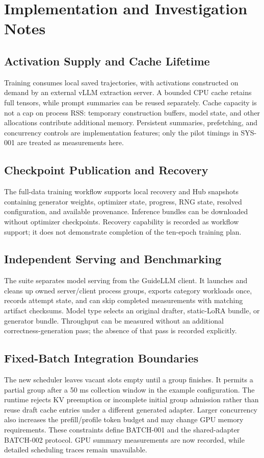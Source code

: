 \section{Implementation and Investigation Notes}
\label{sec:implementation}

\subsection{Activation Supply and Cache Lifetime}
Training consumes local saved trajectories, with activations constructed on
demand by an external vLLM extraction server. A bounded CPU cache retains full
tensors, while prompt summaries can be reused separately. Cache capacity is
not a cap on process RSS: temporary construction buffers, model state, and
other allocations contribute additional memory. Persistent summaries,
prefetching, and concurrency controls are implementation features; only the
pilot timings in SYS-001 are treated as measurements here.

\subsection{Checkpoint Publication and Recovery}
The full-data training workflow supports local recovery and Hub snapshots
containing generator weights, optimizer state, progress, RNG state, resolved
configuration, and available provenance. Inference bundles can be downloaded
without optimizer checkpoints. Recovery capability is recorded as workflow
support; it does not demonstrate completion of the ten-epoch training plan.

\subsection{Independent Serving and Benchmarking}
The suite separates model serving from the GuideLLM client. It launches and
cleans up owned server/client process groups, exports category workloads once,
records attempt state, and can skip completed measurements with matching
artifact checksums. Model type selects an original drafter, static-LoRA bundle,
or generator bundle. Throughput can be measured without an additional
correctness-generation pass; the absence of that pass is recorded explicitly.

\subsection{Fixed-Batch Integration Boundaries}
The new scheduler leaves vacant slots empty until a group finishes. It permits
a partial group after a 50 ms collection window in the example configuration.
The runtime rejects KV preemption or incomplete initial group admission rather
than reuse draft cache entries under a different generated adapter. Larger
concurrency also increases the prefill/profile token budget and may change
GPU memory requirements. These constraints define BATCH-001
and the shared-adapter BATCH-002 protocol. GPU summary measurements are now
recorded, while detailed scheduling traces remain unavailable.

